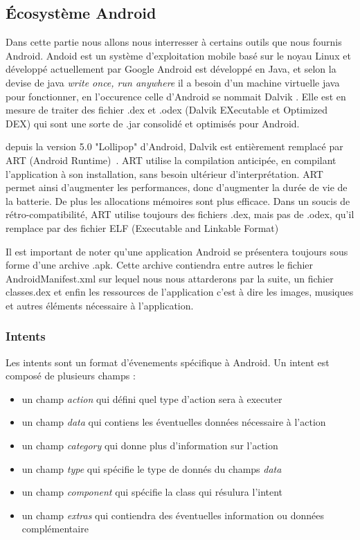 \documentclass[12pt]{article}
\begin{document}
\subsection{Écosystème Android}
Dans cette partie nous allons nous interresser à certains outils que nous fournis Android.
Andoid est un système d'exploitation mobile basé sur le noyau Linux et développé actuellement par Google
Android est développé en Java, et selon la devise de java \textit{\og write once, run anywhere\fg{}} il a besoin d'un machine virtuelle java pour fonctionner, en l'occurence celle d'Android se  nommait \og Dalvik \fg{}. Elle est en mesure de traiter des fichier .dex et .odex (Dalvik EXecutable et Optimized DEX) qui sont une sorte de .jar consolidé et optimisés pour Android.

depuis la version 5.0 "Lollipop" d'Android, Dalvik est entièrement remplacé par ART (Android Runtime)~\cite{ART}. ART utilise la compilation anticipée, en compilant l'application à son installation, sans besoin ultérieur d'interprétation. ART permet ainsi d'augmenter les performances, donc d'augmenter la durée de vie de la batterie. De plus les allocations mémoires sont plus efficace. Dans un soucis de rétro-compatibilité, ART utilise toujours des fichiers .dex, mais pas de .odex, qu'il remplace par des fichier ELF (Executable and Linkable Format)

Il est important de noter qu'une application Android se présentera toujours sous forme d'une archive .apk. Cette archive contiendra entre autres le fichier AndroidManifest.xml sur lequel nous nous attarderons par la suite, un fichier classes.dex et enfin les ressources de l'application c'est à dire les images, musiques et autres éléments nécessaire à l'application.

\subsubsection{Intents}
Les intents sont un format d'évenements spécifique à Android. Un intent est composé de plusieurs champs : 
\begin{itemize}
\item un champ \textit{action} qui défini quel type d'action sera à executer
\item un champ \textit{data} qui contiens les éventuelles données nécessaire à l'action
\item un champ \textit{category} qui donne plus d'information sur l'action
\item un champ \textit{type} qui spécifie le type de donnés du champs \textit{data}
\item un champ \textit{component} qui spécifie la class qui résulura l'intent
\item un champ \textit{extras} qui contiendra des éventuelles information ou données complémentaire
\end{itemize}
\end{document}
